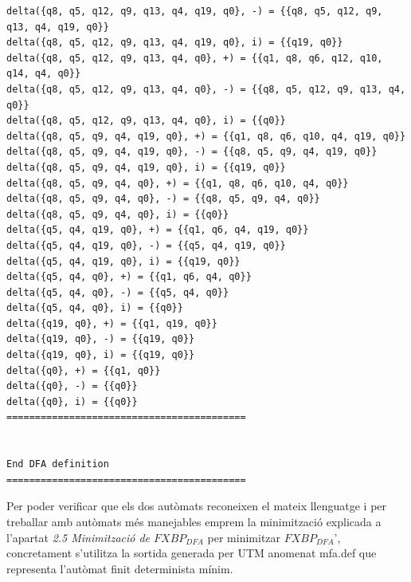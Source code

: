 \documentclass[12pt,a4paper]{report}
\def \dfa{$FXBP_{DFA} $}
\begin{document}
\begin{lstlisting}
delta({q8, q5, q12, q9, q13, q4, q19, q0}, -) = {{q8, q5, q12, q9, q13, q4, q19, q0}}
delta({q8, q5, q12, q9, q13, q4, q19, q0}, i) = {{q19, q0}}
delta({q8, q5, q12, q9, q13, q4, q0}, +) = {{q1, q8, q6, q12, q10, q14, q4, q0}}
delta({q8, q5, q12, q9, q13, q4, q0}, -) = {{q8, q5, q12, q9, q13, q4, q0}}
delta({q8, q5, q12, q9, q13, q4, q0}, i) = {{q0}}
delta({q8, q5, q9, q4, q19, q0}, +) = {{q1, q8, q6, q10, q4, q19, q0}}
delta({q8, q5, q9, q4, q19, q0}, -) = {{q8, q5, q9, q4, q19, q0}}
delta({q8, q5, q9, q4, q19, q0}, i) = {{q19, q0}}
delta({q8, q5, q9, q4, q0}, +) = {{q1, q8, q6, q10, q4, q0}}
delta({q8, q5, q9, q4, q0}, -) = {{q8, q5, q9, q4, q0}}
delta({q8, q5, q9, q4, q0}, i) = {{q0}}
delta({q5, q4, q19, q0}, +) = {{q1, q6, q4, q19, q0}}
delta({q5, q4, q19, q0}, -) = {{q5, q4, q19, q0}}
delta({q5, q4, q19, q0}, i) = {{q19, q0}}
delta({q5, q4, q0}, +) = {{q1, q6, q4, q0}}
delta({q5, q4, q0}, -) = {{q5, q4, q0}}
delta({q5, q4, q0}, i) = {{q0}}
delta({q19, q0}, +) = {{q1, q19, q0}}
delta({q19, q0}, -) = {{q19, q0}}
delta({q19, q0}, i) = {{q19, q0}}
delta({q0}, +) = {{q1, q0}}
delta({q0}, -) = {{q0}}
delta({q0}, i) = {{q0}}
==========================================


End DFA definition
==========================================

\end{lstlisting}

Per poder verificar que els dos autòmats reconeixen el mateix llenguatge i per treballar amb autòmats més manejables emprem la minimització explicada a l’apartat \textit{2.5 Minimització de \dfa{}} per minimitzar \dfa{}', concretament s’utilitza la sortida generada per UTM anomenat mfa.def que representa l’autòmat finit determinista mínim.
\end{document}
